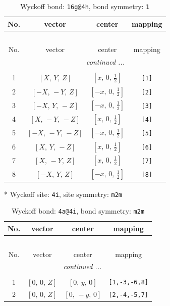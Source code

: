 \documentclass[fleqn,8pt]{jsarticle}
\begin{document}
\begin{longtable}{cccc}
\caption{Wyckoff bond: {\tt 16g@4h}, bond symmetry: {\tt 1}}
 \\
 \hline \hline
No. & vector & center & mapping \\ \hline \endfirsthead

\multicolumn{3}{l}{\tablename\ \thetable{}} \\
 \hline \hline
No. & vector & center & mapping \\ \hline \endhead

 \hline \hline
\multicolumn{3}{r}{\footnotesize\it continued ...} \\ \endfoot

 \hline \hline
\multicolumn{3}{r}{} \\ \endlastfoot

1 & $\left[ X,\, Y,\, Z \right]$ & $\left[ x,\, 0,\, \frac{1}{2} \right]$ & {\tt [1]} \\ \hline
2 & $\left[ - X,\, - Y,\, Z \right]$ & $\left[ - x,\, 0,\, \frac{1}{2} \right]$ & {\tt [2]} \\ \hline
3 & $\left[ - X,\, Y,\, - Z \right]$ & $\left[ - x,\, 0,\, \frac{1}{2} \right]$ & {\tt [3]} \\ \hline
4 & $\left[ X,\, - Y,\, - Z \right]$ & $\left[ x,\, 0,\, \frac{1}{2} \right]$ & {\tt [4]} \\ \hline
5 & $\left[ - X,\, - Y,\, - Z \right]$ & $\left[ - x,\, 0,\, \frac{1}{2} \right]$ & {\tt [5]} \\ \hline
6 & $\left[ X,\, Y,\, - Z \right]$ & $\left[ x,\, 0,\, \frac{1}{2} \right]$ & {\tt [6]} \\ \hline
7 & $\left[ X,\, - Y,\, Z \right]$ & $\left[ x,\, 0,\, \frac{1}{2} \right]$ & {\tt [7]} \\ \hline
8 & $\left[ - X,\, Y,\, Z \right]$ & $\left[ - x,\, 0,\, \frac{1}{2} \right]$ & {\tt [8]} \\
\end{longtable}
* Wyckoff site: {\tt 4i}, site symmetry: {\tt m2m}
\renewcommand{\arraystretch}{1.2}
\begin{longtable}{cccc}
\caption{Wyckoff bond: {\tt 4a@4i}, bond symmetry: {\tt m2m}}
 \\
 \hline \hline
No. & vector & center & mapping \\ \hline \endfirsthead

\multicolumn{3}{l}{\tablename\ \thetable{}} \\
 \hline \hline
No. & vector & center & mapping \\ \hline \endhead

 \hline \hline
\multicolumn{3}{r}{\footnotesize\it continued ...} \\ \endfoot

 \hline \hline
\multicolumn{3}{r}{} \\ \endlastfoot

1 & $\left[ 0,\, 0,\, Z \right]$ & $\left[ 0,\, y,\, 0 \right]$ & {\tt [1,-3,-6,8]} \\ \hline
2 & $\left[ 0,\, 0,\, Z \right]$ & $\left[ 0,\, - y,\, 0 \right]$ & {\tt [2,-4,-5,7]} \\
\end{longtable}
\end{document}
